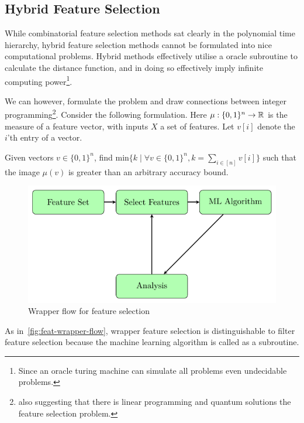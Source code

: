 \documentclass[conference]{IEEEtran}
\begin{document}
\subsection{Hybrid Feature Selection}

While combinatorial feature selection methods sat clearly in the polynomial time hierarchy, hybrid feature selection methods cannot be formulated into nice computational problems. Hybrid methods effectively utilise a oracle subroutine to calculate the distance function, and in doing so effectively imply infinite computing power\footnote{Since an oracle turing machine can simulate all problems even undecidable problems.}.

We can however, formulate the problem and draw connections between integer programming\footnote{also suggesting that there is linear programming and quantum solutions the feature selection problem.}. Consider the following formulation. Here $\mu : \{ 0, 1 \}^{n} \to \mathbb{R}$ is the measure of a feature vector, with inputs $X$ a set of features. Let $v[i]$ denote the $i$'th entry of a vector.

\begin{definition}
	Given vectors $v\in \{0,1\}^{n}$, find $\text{min}\{ k \mid \forall v\in \{0,1\}^{n}, k=\sum_{i\in[n]} v[i] \}$ such that the image $\mu(v)$ is greater than an arbitrary accuracy bound.
\end{definition}

\begin{figure}[h]
	\begin{center}
		\includegraphics[scale=0.5]{wrapper-flow.pdf}
		\caption{Wrapper flow for feature selection}\label{fig:feat-wrapper-flow}
	\end{center}
\end{figure}

As in~\autoref{fig:feat-wrapper-flow}, wrapper feature selection is distinguishable to filter feature selection because the machine learning algorithm is called as a subroutine.
\end{document}
